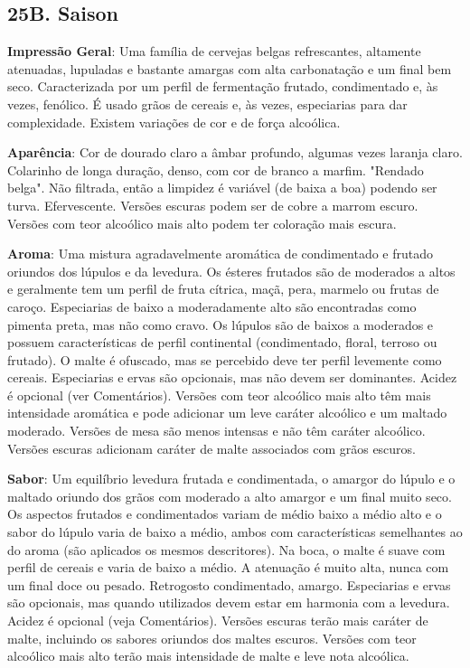 \subsection*{25B. Saison}

\textbf{Impressão Geral}: Uma família de cervejas belgas refrescantes, altamente atenuadas, lupuladas e bastante amargas com alta carbonatação e um final bem seco. Caracterizada por um perfil de fermentação frutado, condimentado e, às vezes, fenólico. É usado grãos de cereais e, às vezes, especiarias para dar complexidade. Existem variações de cor e de força alcoólica.

\textbf{Aparência}: Cor de dourado claro a âmbar profundo, algumas vezes laranja claro. Colarinho de longa duração, denso, com cor de branco a marfim. "Rendado belga". Não filtrada, então a limpidez é variável (de baixa a boa) podendo ser turva. Efervescente. Versões escuras podem ser de cobre a marrom escuro. Versões com teor alcoólico mais alto podem ter coloração mais escura.

\textbf{Aroma}: Uma mistura agradavelmente aromática de condimentado e frutado oriundos dos lúpulos e da levedura. Os ésteres frutados são de moderados a altos e geralmente tem um perfil de fruta cítrica, maçã, pera, marmelo ou frutas de caroço. Especiarias de baixo a moderadamente alto são encontradas como pimenta preta, mas não como cravo. Os lúpulos são de baixos a moderados e possuem características de perfil continental (condimentado, floral, terroso ou frutado). O malte é ofuscado, mas se percebido deve ter perfil levemente como cereais. Especiarias e ervas são opcionais, mas não devem ser dominantes. Acidez é opcional (ver Comentários). Versões com teor alcoólico mais alto têm mais intensidade aromática e pode adicionar um leve caráter alcoólico e um maltado moderado. Versões de mesa são menos intensas e não têm caráter alcoólico. Versões escuras adicionam caráter de malte associados com grãos escuros.

\textbf{Sabor}: Um equilíbrio levedura frutada e condimentada, o amargor do lúpulo e o maltado oriundo dos grãos com moderado a alto amargor e um final muito seco. Os aspectos frutados e condimentados variam de médio baixo a médio alto e o sabor do lúpulo varia de baixo a médio, ambos com características semelhantes ao do aroma (são aplicados os mesmos descritores). Na boca, o malte é suave com perfil de cereais e varia de baixo a médio. A atenuação é muito alta, nunca com um final doce ou pesado. Retrogosto condimentado, amargo. Especiarias e ervas são opcionais, mas quando utilizados devem estar em harmonia com a levedura. Acidez é opcional (veja Comentários). Versões escuras terão mais caráter de malte, incluindo os sabores oriundos dos maltes escuros. Versões com teor alcoólico mais alto terão mais intensidade de malte e leve nota alcoólica.

